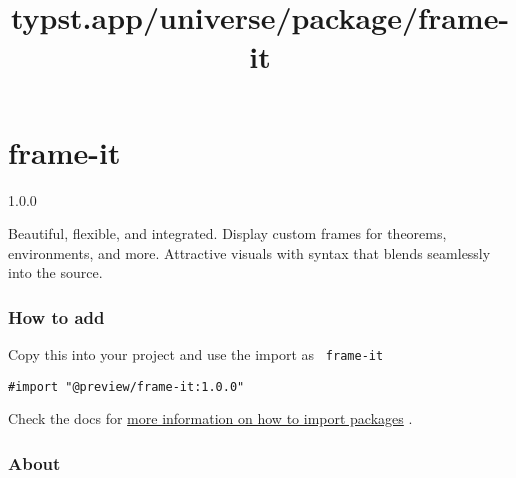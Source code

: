 \title{typst.app/universe/package/frame-it}

\label{banner}
\section{frame-it}\label{frame-it}

{ 1.0.0 }

Beautiful, flexible, and integrated. Display custom frames for theorems,
environments, and more. Attractive visuals with syntax that blends
seamlessly into the source.

\label{readme}
\pandocbounded{}

\subsubsection{How to add}\label{how-to-add}

Copy this into your project and use the import as \texttt{\ frame-it\ }

\begin{verbatim}
#import "@preview/frame-it:1.0.0"
\end{verbatim}



Check the docs for
\href{https://typst.app/docs/reference/scripting/\#packages}{more
information on how to import packages} .

\subsubsection{About}\label{about}

